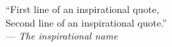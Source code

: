\thispagestyle{empty}
\vspace*{3cm}
\begin{center}
``First line of an inspirational quote, \\
Second line of an inspirational quote.'' \\
 \smallskip
--- \emph{The inspirational name} %
\end{center}